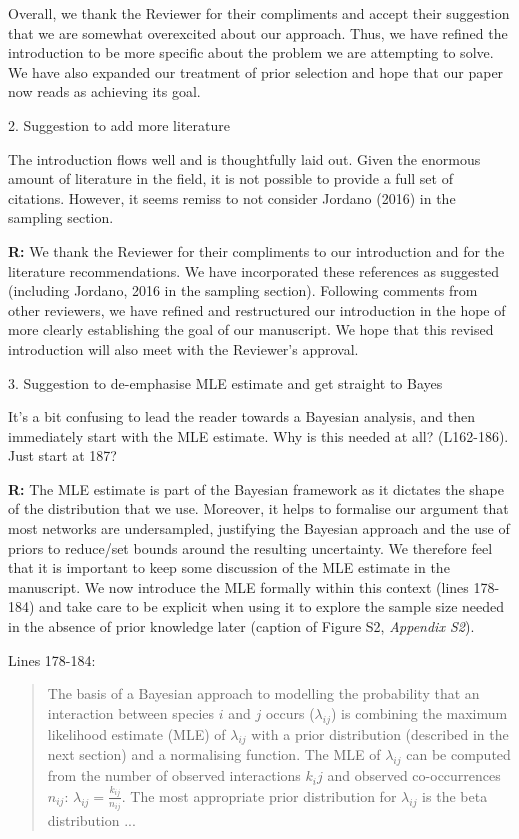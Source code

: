 \documentclass[12pt]{letter}
\newenvironment{refquote}{\bigskip \begin{it}}{\end{it}\smallskip}
\begin{document}
		Overall, we thank the Reviewer for their compliments and accept their suggestion that we are somewhat overexcited about our approach. Thus, we have refined the introduction to be more specific about the problem we are attempting to solve. We have also expanded our treatment of prior selection and hope that our paper now reads as achieving its goal.


	2. Suggestion to add more literature


		\begin{refquote}
		The introduction flows well and is thoughtfully laid out. Given the enormous amount of literature in the field, it is not possible to provide a full set of citations. However, it seems remiss to not consider Jordano (2016) in the sampling section.
		\end{refquote}


		\textbf{R:} We thank the Reviewer for their compliments to our introduction and for the literature recommendations. We have incorporated these references as suggested (including Jordano, 2016 in the sampling section). Following comments from other reviewers, we have refined and restructured our introduction in the hope of more clearly establishing the goal of our manuscript. We hope that this revised introduction will also meet with the Reviewer's approval. 


	3. Suggestion to de-emphasise MLE estimate and get straight to Bayes


		\begin{refquote}
		It's a bit confusing to lead the reader towards a Bayesian analysis, and then immediately start with the MLE estimate. Why is this needed at all? (L162-186). Just start at 187?
		\end{refquote}


		\textbf{R:} The MLE estimate is part of the Bayesian framework as it dictates the shape of the distribution that we use. Moreover, it helps to formalise our argument that most networks are undersampled, justifying the Bayesian approach and the use of priors to reduce/set bounds around the resulting uncertainty. We therefore feel that it is important to keep some discussion of the MLE estimate in the manuscript. We now introduce the MLE formally within this context (lines 178-184) and take care to be explicit when using it to explore the sample size needed in the absence of prior knowledge later (caption of Figure S2, \emph{Appendix S2}).


		Lines 178-184:


		\begin{quotation}
			The basis of a Bayesian approach to modelling the probability that an interaction between species $i$ and $j$ occurs ($\lambda_{ij}$) is combining the maximum likelihood estimate (MLE) of $\lambda_{ij}$ with a prior distribution (described in the next section) and a normalising function. The MLE of $\lambda_{ij}$ can be computed from the number of observed interactions $k_ij$ and observed co-occurrences $n_{ij}$: $\lambda_{ij}=\frac{k_{ij}}{n_{ij}}$. The most appropriate prior distribution for $\lambda_{ij}$ is the beta distribution ...
		\end{quotation}
\end{document}
